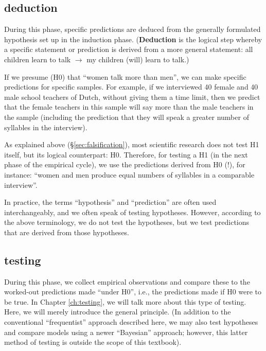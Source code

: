 \documentclass[
]{book}
\begin{document}
\hypertarget{deduction}{%
\subsection{deduction}\label{deduction}}

During this phase, specific predictions are deduced from the generally formulated hypothesis set up in the induction phase. (\textbf{Deduction} is the logical step whereby a specific statement or prediction is derived from a more general statement: all children learn to talk \(\rightarrow\) my children (will) learn to talk.)

If we presume (H0) that ``women talk more than men'', we can make specific predictions for specific samples. For example, if we interviewed 40 female and 40 male school teachers of Dutch, without giving them a time limit, then we predict that the female teachers in this sample will say more than the male teachers in the sample (including the prediction that they will speak a greater number of syllables in the interview).

As explained above (§\ref{sec:falsification}), most scientific research does not test H1 itself, but its logical counterpart: H0. Therefore, for testing a H1 (in the next phase of the empirical cycle), we use the predictions derived from H0 (!), for instance: ``women and men produce equal numbers of syllables in a comparable interview''.

In practice, the terms ``hypothesis'' and ``prediction'' are often used interchangeably, and we often speak of testing hypotheses. However, according to the above terminology, we do not test the hypotheses, but we test predictions that are derived from those hypotheses.

\hypertarget{testing}{%
\subsection{testing}\label{testing}}

During this phase, we collect empirical observations and compare these to the worked-out predictions made ``under H0'', i.e., the predictions made if H0 were to be true. In Chapter \ref{ch:testing}, we will talk more about this type of testing. Here, we will merely introduce the general principle.
(In addition to the conventional ``frequentist'' approach described here, we may also test hypotheses and compare models using a newer ``Bayesian'' approach; however, this latter method of testing is outside the scope of this textbook).
\end{document}
